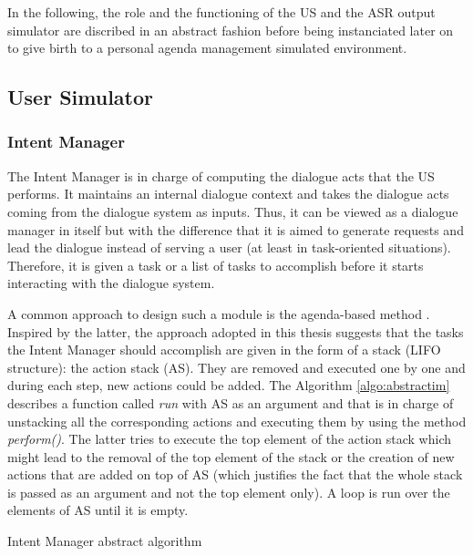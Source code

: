                                 In the following, the role and the functioning of the US and the ASR output simulator are discribed in an abstract fashion before being instanciated later on to give birth to a personal agenda management simulated environment.
    
	\subsection{User Simulator}

			\subsubsection{Intent Manager}
			\label{subsec:intentmanager}

					The Intent Manager is in charge of computing the dialogue acts that the US performs. It maintains an internal dialogue context and takes the dialogue acts coming from the dialogue system as inputs. Thus, it can be viewed as a dialogue manager in itself but with the difference that it is aimed to generate requests and lead the dialogue instead of serving a user (at least in task-oriented situations). Therefore, it is given a task or a list of tasks to accomplish before it starts interacting with the dialogue system.

					A common approach to design such a module is the agenda-based method \cite{Wei1999,Schatzmann2007}. Inspired by the latter, the approach adopted in this thesis suggests that the tasks the Intent Manager should accomplish are given in the form of a stack (LIFO structure): the action stack (AS). They are removed and executed one by one and during each step, new actions could be added. The Algorithm \ref{algo:abstractim} describes a function called \textit{run} with AS as an argument and that is in charge of unstacking all the corresponding actions and executing them by using the method \textit{perform()}. The latter tries to execute the top element of the action stack which might lead to the removal of the top element of the stack or the creation of new actions that are added on top of AS (which justifies the fact that the whole stack is passed as an argument and not the top element only). A loop is run over the elements of AS until it is empty.

					\begin{algorithm}[htp]
						\DontPrintSemicolon
						\caption{Intent Manager abstract algorithm}
						\label{algo:abstractim}
					\end{algorithm}

